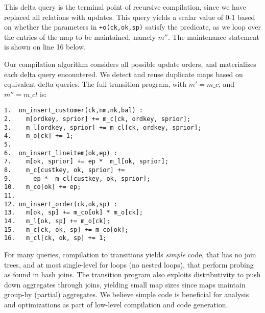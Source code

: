 {\noindent This delta query is the terminal point of recursive compilation, since
we have replaced all relations with updates. This query yields a scalar value of
0-1 based on whether the parameters in {\tt +o(ck,ok,sp)} satisfy the predicate,
as we loop over the entries of the map to be maintained, namely $m''$. The
maintenance statement is shown on line 16 below.


\noindent Our compilation algorithm considers all possible update orders, and
materializes each delta query encountered. We detect and reuse duplicate maps
based on equivalent delta queries. The full transition program, with $m' =
m\_c$, and $m''=m\_cl$ is:
}

{\footnotesize
\begin{verbatim}
1.  on_insert_customer(ck,nm,nk,bal) :
2.    m[ordkey, sprior] += m_c[ck, ordkey, sprior];
3.    m_l[ordkey, sprior] += m_cl[ck, ordkey, sprior];
4.    m_o[ck] += 1;
5. 
6.  on_insert_lineitem(ok,ep) :
7.    m[ok, sprior] += ep *  m_l[ok, sprior];
8.    m_c[custkey, ok, sprior] +=
9.      ep *  m_cl[custkey, ok, sprior];
10.   m_co[ok] += ep;
11.
12. on_insert_order(ck,ok,sp) :
13.   m[ok, sp] += m_co[ok] * m_o[ck]; 
14.   m_l[ok, sp] += m_o[ck];
15.   m_c[ck, ok, sp] += m_co[ok];
16.   m_cl[ck, ok, sp] += 1;
\end{verbatim}
}

For many queries, compilation to transitions yields \textit{simple} code, that
has no join trees, and at most single-level for loops (no nested loops), that
perform probing as found in hash joins. The transition program also
exploits distributivity to push down aggregates through joins, yielding small
map sizes since maps maintain group-by (partial) aggregates. We believe simple
code is beneficial for analysis and optimizations as part of low-level
compilation and code generation.

